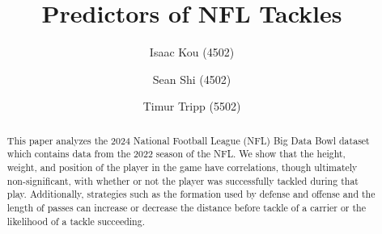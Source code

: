 \documentclass[bibtex, sigconf, hyperref={colorlinks=true,linkcolor=blue,urlcolor=blue}]{acmart}
\begin{document}
\title{Predictors of NFL Tackles}

\author{Isaac Kou (4502)}

\author{Sean Shi (4502)}

\author{Timur Tripp (5502)}



\renewcommand{\shortauthors}{Kou et al.}


\begin{abstract}
This paper analyzes the 2024 National Football League (NFL) Big Data Bowl dataset
which contains data from the 2022 season of the NFL.
We show that the height, weight, and position of the player in the game have correlations,
though ultimately non-significant, with whether or not the player was
successfully tackled during that play. Additionally, strategies such as the formation used
by defense and offense and the length of passes can increase or decrease the distance before tackle of
a carrier or the likelihood of a tackle succeeding.
\end{abstract}
\end{document}
